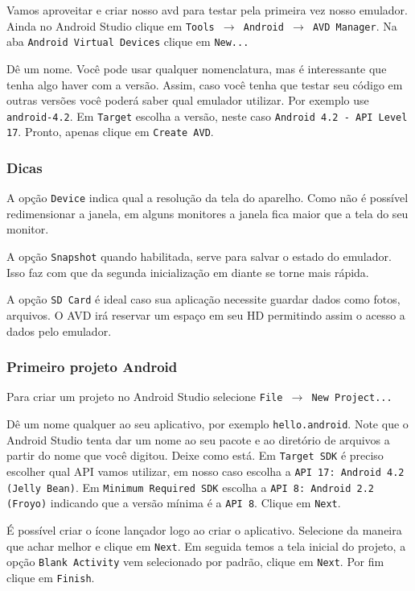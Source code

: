 Vamos aproveitar e criar nosso \gls{avd} para testar pela primeira vez nosso emulador.
Ainda no Android Studio clique em \texttt{Tools $\rightarrow$ Android $\rightarrow$ AVD Manager}.
Na aba \texttt{Android Virtual Devices} clique em \texttt{New...}

Dê um nome. Você pode usar qualquer nomenclatura, mas é interessante que tenha algo
haver com a versão. Assim, caso você tenha que testar seu código em outras versões
você poderá saber qual emulador utilizar. Por exemplo use \texttt{android-4.2}.
Em \texttt{Target} escolha a versão, neste caso \texttt{Android 4.2 - API Level 17}.
Pronto, apenas clique em \texttt{Create AVD}.

\subsubsection{Dicas}

A opção \texttt{Device} indica qual a resolução da tela do aparelho. Como não é possível
redimensionar a janela, em alguns monitores a janela fica maior que a tela do seu monitor.

A opção \texttt{Snapshot} quando habilitada, serve para salvar o estado do emulador. Isso faz
com que da segunda inicialização em diante se torne mais rápida.

A opção \texttt{SD Card} é ideal caso sua aplicação necessite guardar dados como fotos, arquivos.
O AVD irá reservar um espaço em seu HD permitindo assim o acesso a dados pelo emulador.

\subsubsection{Primeiro projeto Android \label{sssec:testando}}

Para criar um projeto no Android Studio selecione \texttt{File $\rightarrow$ New Project...}

Dê um nome qualquer ao seu aplicativo,
por exemplo \texttt{hello.android}. Note que o Android Studio tenta dar um nome ao seu
pacote e ao diretório de arquivos
a partir do nome que você digitou. Deixe como está. Em \texttt{Target SDK} é preciso escolher qual API vamos
utilizar, em nosso caso escolha a \texttt{API 17: Android 4.2 (Jelly Bean)}.
Em \texttt{Minimum Required SDK} escolha
a \texttt{API 8: Android 2.2 (Froyo)} indicando que a versão mínima é a \texttt{API 8}. Clique em \texttt{Next}.

É possível criar o ícone lançador logo ao criar o aplicativo. Selecione da maneira que achar
melhor e clique em \texttt{Next}. Em seguida temos a tela inicial do projeto, a opção
\texttt{Blank Activity} vem selecionado por padrão, clique em \texttt{Next}. Por fim
clique em \texttt{Finish}.

